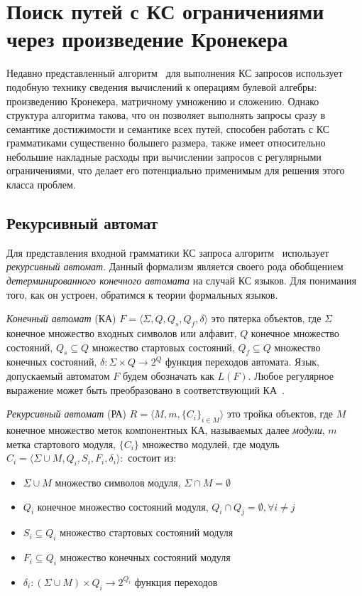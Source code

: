 \section{Поиск путей с КС ограничениями через произведение Кронекера}

Недавно представленный алгоритм~\cite{inbook:kronecker_cfpq_adbis} для выполнения КС запросов использует подобную технику сведения вычислений к операциям булевой алгебры: произведению Кронекера, матричному умножению и сложению. Однако структура алгоритма такова, что он позволяет выполнять запросы сразу в семантике достижимости и семантике всех путей, способен работать с КС грамматиками существенно большего размера, также имеет относительно небольшие накладные расходы при вычислении запросов с регулярными ограничениями, что делает его потенциально применимым для решения этого класса проблем. 

\subsection{Рекурсивный автомат}

Для представления входной грамматики КС запроса алгоритм~\cite{inbook:kronecker_cfpq_adbis} использует \textit{рекурсивный автомат}. Данный формализм является своего рода обобщением \textit{детерминированного конечного автомата} на случай КС языков. Для понимания того, как он устроен, обратимся к теории формальных языков.

\textit{Конечный автомат} (КА) $F = \langle \Sigma, Q, Q_s, Q_f, \delta \rangle$ это пятерка объектов, где $\Sigma$ конечное множество входных символов или алфавит, $Q$ конечное множество состояний, $Q_s \subseteq Q$ множество стартовых состояний, $Q_f \subseteq Q$ множество конечных состояний, $\delta : \Sigma \times Q \rightarrow 2^Q$ функция переходов автомата. Язык, допускаемый автоматом $F$ будем обозначать как $L(F)$. Любое регулярное выражение может быть преобразовано в соответствующий КА~\cite{book:automata_theory}. 

\textit{Рекурсивный автомат} (РА) $R = \langle M, m, \{C_i\}_{i \in M} \rangle$ это тройка объектов, где $M$ конечное множество меток компонентных КА, называемых далее \textit{модули}, $m$ метка стартового модуля, $\{C_i\}$ множество модулей, где модуль $C_i = \langle \Sigma \cup M, Q_i, S_i, F_i, \delta _i \rangle: $ состоит из:

\begin{itemize}
    \item $\Sigma \cup M$ множество символов модуля, $\Sigma \cap M = \emptyset$
    \item $Q_i$ конечное множество состояний модуля, $Q_i \cap Q_j = \emptyset, \forall i \neq j$
    \item $S_i \subseteq Q_i$ множество стартовых состояний модуля
    \item $F_i \subseteq Q_i$ множество конечных состояний модуля 
    \item $\delta_i : (\Sigma \cup M) \times Q_i \rightarrow 2^{Q_i}$ функция переходов
\end{itemize}


